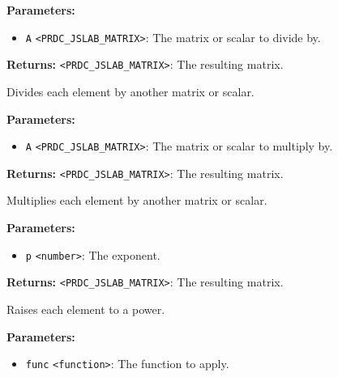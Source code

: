 \documentclass[12pt,a4paper]{article}
\begin{document}
\noindent \textbf{Parameters:}
\begin{itemize}
  \item \texttt{A} \texttt{<PRDC\_JSLAB\_MATRIX>}: The matrix or scalar to divide by.
\end{itemize}

\noindent \textbf{Returns:} \texttt{<PRDC\_JSLAB\_MATRIX>}: The resulting matrix.

\noindent Divides each element by another matrix or scalar.

\vspace{5mm}
\noindent {}


\noindent \textbf{Parameters:}
\begin{itemize}
  \item \texttt{A} \texttt{<PRDC\_JSLAB\_MATRIX>}: The matrix or scalar to multiply by.
\end{itemize}

\noindent \textbf{Returns:} \texttt{<PRDC\_JSLAB\_MATRIX>}: The resulting matrix.

\noindent Multiplies each element by another matrix or scalar.

\vspace{5mm}
\noindent {}


\noindent \textbf{Parameters:}
\begin{itemize}
  \item \texttt{p} \texttt{<number>}: The exponent.
\end{itemize}

\noindent \textbf{Returns:} \texttt{<PRDC\_JSLAB\_MATRIX>}: The resulting matrix.

\noindent Raises each element to a power.

\vspace{5mm}
\noindent {}


\noindent \textbf{Parameters:}
\begin{itemize}
  \item \texttt{func} \texttt{<function>}: The function to apply.
\end{itemize}
\end{document}
